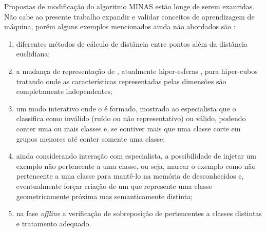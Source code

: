 Propostas de modificação do algoritmo MINAS estão longe de serem exauridas.
Não cabe ao presente trabalho expandir e validar conceitos de aprendizagem de máquina,
porém alguns exemplos mencionados ainda não abordados são \cite{DaSilva2018,DaSilva2018thesis,Costa2019}:

\begin{enumerate}[label={\alph*)}]
    
    \item diferentes métodos de cálculo de distância entre pontos além da
    distância euclidiana;
    
    \item a mudança de representação de \clusters, atualmente hiper-esferas
    \cite{Costa2019thesis}, para hiper-cubos tratando \datasets onde as
    características representadas pelas dimensões são completamente
    independentes;
    
    \item um modo interativo onde o \cluster é formado, mostrado ao especialista
    que o classifica como inválido (ruído ou não representativo) ou válido,
    podendo conter uma ou mais classes e, se contiver mais que uma classe corte em
    grupos menores até conter somente uma classe;
    
    \item ainda considerando interação com especialista, a possibilidade de
    injetar um exemplo não pertencente a uma classe, ou seja, marcar o exemplo
    como não pertencente a uma classe para mantê-lo na memória de
    desconhecidos e, eventualmente forçar criação de um \cluster que represente
    uma classe geometricamente próxima mas semanticamente distinta;
    
    \item na fase \emph{offline} a verificação de sobreposição de \clusters
    pertencentes a classes distintas e tratamento adequado.

\end{enumerate}
